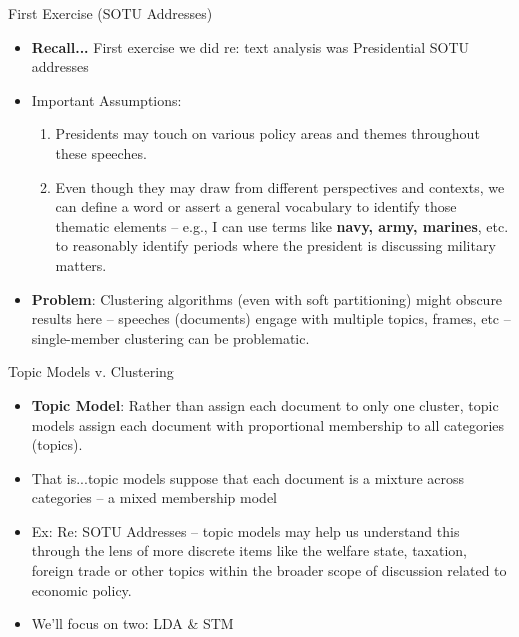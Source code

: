 \documentclass[
  ignorenonframetext,
  aspectratio=169]{beamer}
\begin{document}
\begin{frame}{First Exercise (SOTU Addresses)}
\label{first-exercise-sotu-addresses}
\begin{itemize}
\item \textbf{Recall...} First exercise we did re: text analysis was Presidential SOTU addresses \par \vspace{2.5mm} \pause
\item Important Assumptions:  \pause
  \begin{enumerate}
  \item Presidents may touch on various policy areas and themes throughout these speeches. \par \vspace{2.5mm} \pause
  \item Even though they may draw from different perspectives and contexts, we can define a word or assert a general vocabulary to identify those thematic elements -- e.g., I can use terms like \textbf{navy, army, marines}, etc. to reasonably identify periods where the president is discussing military matters.
  \end{enumerate} \par \vspace{2.5mm} \pause
\item \textbf{Problem}: Clustering algorithms (even with soft partitioning) might obscure results here -- speeches (documents) engage with multiple topics, frames, etc -- single-member clustering can be problematic. 
\end{itemize}
\end{frame}

\begin{frame}{Topic Models v. Clustering}
\label{topic-models-v.-clustering}
\begin{itemize}
\item \textbf{Topic Model}: Rather than assign each document to only one cluster, topic models assign each document with proportional membership to all categories (topics). 
\item That is...topic models suppose that each document is a mixture across categories – a mixed membership model \par \vspace{2.5mm}
\item Ex: Re: SOTU Addresses -- topic models may help us understand this through the lens of more discrete items like the welfare state, taxation, foreign trade or other topics within the broader scope of discussion related to economic policy. \par \vspace{2.5mm}
\item We'll focus on two: LDA \& STM
\end{itemize}
\end{frame}
\end{document}
